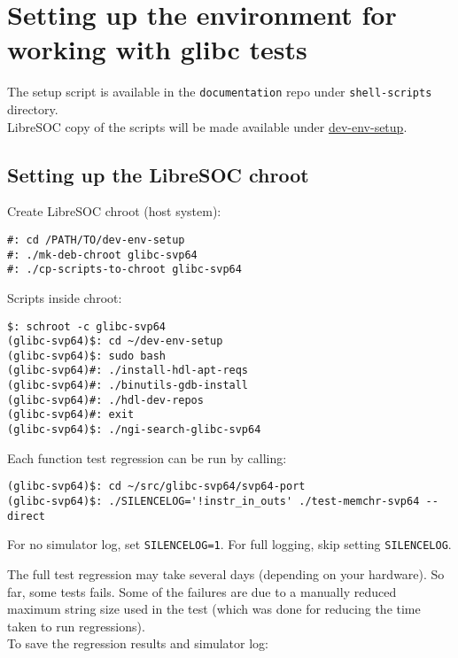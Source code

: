 \section{Setting up the environment for working with glibc tests}

The setup script is available in the \texttt{documentation} repo
under \texttt{shell-scripts} directory.\\

LibreSOC copy of the scripts will be made available under
\href{https://git.libre-soc.org/?p=dev-env-setup.git;a=tree}{dev-env-setup}.

\subsection{Setting up the LibreSOC chroot}

Create LibreSOC chroot (host system):

\begin{verbatim}
#: cd /PATH/TO/dev-env-setup
#: ./mk-deb-chroot glibc-svp64
#: ./cp-scripts-to-chroot glibc-svp64
\end{verbatim}

Scripts inside chroot:

\begin{verbatim}
$: schroot -c glibc-svp64
(glibc-svp64)$: cd ~/dev-env-setup
(glibc-svp64)$: sudo bash
(glibc-svp64)#: ./install-hdl-apt-reqs
(glibc-svp64)#: ./binutils-gdb-install
(glibc-svp64)#: ./hdl-dev-repos
(glibc-svp64)#: exit
(glibc-svp64)$: ./ngi-search-glibc-svp64
\end{verbatim}

Each function test regression can be run by calling:

\begin{verbatim}
(glibc-svp64)$: cd ~/src/glibc-svp64/svp64-port
(glibc-svp64)$: ./SILENCELOG='!instr_in_outs' ./test-memchr-svp64 --direct
\end{verbatim}

For no simulator log, set \texttt{SILENCELOG=1}.
For full logging, skip setting \texttt{SILENCELOG}.

The full test regression may take several days (depending on your hardware).
So far, some tests fails. Some of the failures are due to a manually reduced
maximum string size used in the test (which was done for reducing the time
taken to run regressions).\\

To save the regression results and simulator log:

